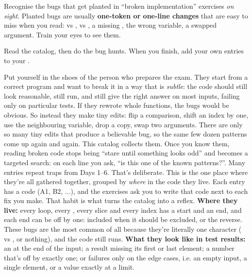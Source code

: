 \documentclass[10pt,a4paper]{article}
\begin{document}
\makecover
\setcounter{page}{2}
\makefrontmatter
\begin{goalbox}
Recognise the bugs that get planted in “broken implementation” exercises \emph{on sight}. Planted bugs are usually \textbf{one-token or one-line changes} that are easy to miss when you read: \code{\textless{}\allowbreak{}} vs \code{\textless{}\allowbreak{}=\allowbreak{}},  vs , a missing , the wrong variable, a swapped argument. Train your eyes to see them.
\end{goalbox}
\vspace{2pt}
\begin{tipbox}
Read the catalog, then do the bug hunts. When you finish, add your own entries to your .
\end{tipbox}
Put yourself in the shoes of the person who prepares the exam. They start from a correct program and want to break it in a way that is \emph{subtle}: the code should still look reasonable, still run, and still give the right answer on most inputs, failing only on particular tests. If they rewrote whole functions, the bugs would be obvious. So instead they make tiny edits: flip a comparison, shift an index by one, use the neighbouring variable, drop a copy, swap two arguments.
There are only so many tiny edits that produce a believable bug, so the same few dozen patterns come up again and again. This catalog collects them. Once you know them, reading broken code stops being “stare until something looks odd” and becomes a targeted search: on each line you ask, “is this one of the known patterns?”.
Many entries repeat traps from Days 1–6. That’s deliberate. This is the one place where they’re all gathered together, grouped by \emph{where} in the code they live. Each entry has a code (A1, B2, ...), and the exercises ask you to write that code next to each fix you make. That habit is what turns the catalog into a reflex.
\textbf{Where they live:} every loop, every , every slice and every index has a start and an end, and each end can be off by one: included when it should be excluded, or the reverse. These bugs are the most common of all because they’re literally one character (\code{\textless{}\allowbreak{}} vs \code{\textless{}\allowbreak{}=\allowbreak{}},  or nothing), and the code still runs.
\textbf{What they look like in test results:} an  at the end of the input; a result missing its first or last element; a number that’s off by exactly one; or failures only on the edge cases, i.e. an empty input, a single element, or a value exactly at a limit.
\end{document}
